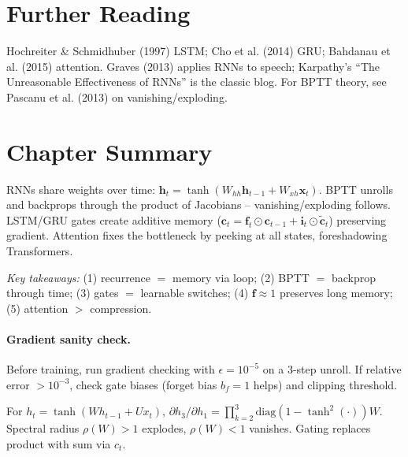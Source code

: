 \section{Further Reading}
Hochreiter \& Schmidhuber (1997) LSTM; Cho et al. (2014) GRU; Bahdanau et al.
(2015) attention. Graves (2013) applies RNNs to speech; Karpathy's ``The
Unreasonable Effectiveness of RNNs'' is the classic blog. For BPTT theory, see
Pascanu et al. (2013) on vanishing/exploding.

\section{Chapter Summary}
RNNs share weights over time: $\mathbf{h}_t=\tanh(W_{hh}\mathbf{h}_{t-1}+
W_{xh}\mathbf{x}_t)$. BPTT unrolls and backprops through the product of
Jacobians -- vanishing/exploding follows. LSTM/GRU gates create additive
memory ($\mathbf{c}_t=\mathbf{f}_t\odot\mathbf{c}_{t-1}+\mathbf{i}_t\odot
\tilde{\mathbf{c}}_t$) preserving gradient. Attention fixes the bottleneck by
peeking at all states, foreshadowing Transformers.

\smallskip
\noindent\textit{Key takeaways:} (1) recurrence $=$ memory via loop;
(2) BPTT $=$ backprop through time; (3) gates $=$ learnable switches;
(4) $\mathbf{f}\approx1$ preserves long memory; (5) attention $>$ compression.

\paragraph{Gradient sanity check.} Before training, run gradient checking with $\epsilon=10^{-5}$ on a 3-step unroll. If relative error $>10^{-3}$, check gate biases (forget bias $b_f=1$ helps) and clipping threshold.

\begin{example} For $h_t=\tanh(W h_{t-1}+U x_t)$, $\partial h_3/\partial h_1 = \prod_{k=2}^3 \text{diag}(1-\tanh^2(\cdot))W$. Spectral radius $\rho(W)>1$ explodes, $\rho(W)<1$ vanishes. Gating replaces product with sum via $c_t$.
\end{example}

